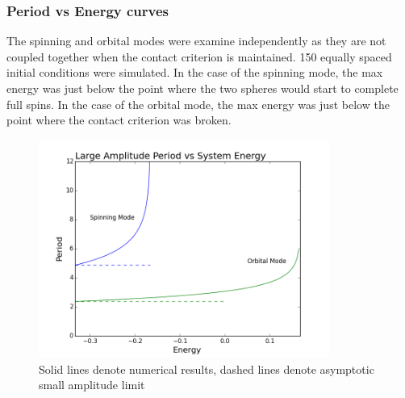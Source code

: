 \documentclass[prb,preprint]{revtex4-1}
\begin{document}
\subsubsection{Period vs Energy curves}
The spinning and orbital modes were examine independently as they are not coupled together when the contact criterion is maintained. 150 equally spaced initial conditions were simulated. In the case of the spinning mode, the max energy was just below the point where the two spheres would start to complete full spins. In the case of the orbital mode, the max energy was just below the point where the contact criterion was broken.

\begin{figure}[h]
	\centering
	\includegraphics[width=0.85\textwidth]{./images/plot.png}
	\caption{Solid lines denote numerical results, dashed lines denote asymptotic small amplitude limit}
\end{figure}





\end{document}
